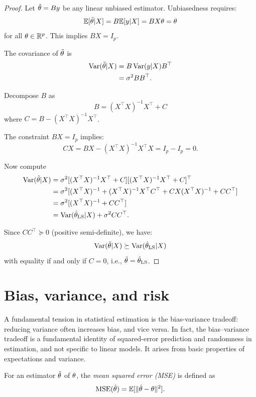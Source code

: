 \begin{proof}
Let $\tilde{\theta} = By$ be any linear unbiased estimator. Unbiasedness requires:
$$\mathbb{E}[\tilde{\theta} | X ] = B\mathbb{E}[y | X ] = BX \theta = \theta$$
for all $\theta \in \mathbb{R}^p$. This implies $BX  = I_p$.

The covariance of $\tilde{\theta}$ is
\begin{align*}
  \operatorname{Var}(\tilde{\theta} | X )
  &= B\operatorname{Var}(y | X )B^\top\\
  &= \sigma^2BB^\top.
\end{align*}

Decompose $B$ as
$$B = (X^\top X )^{-1}X^\top + C$$
where $C = B - (X^\top X)^{-1} X ^\top$.

The constraint $B X  = I_p$ implies:
$$C X  = B X  - ( X^\top X )^{-1} X^\top X = I_p - I_p = 0.$$

Now compute
\begin{align*}
  \operatorname{Var}(\tilde{\theta} | X)
  &= \sigma^2[(X^\top X)^{-1}X^\top + C][(X^\top X)^{-1}X^\top + C]^\top\\
  &= \sigma^2[(X^\top X)^{-1} 
     + (X^\top X)^{-1}X^\top C^\top 
     + CX(X^\top X)^{-1} 
     + CC^\top]\\
  &= \sigma^2[(X^\top X)^{-1} + CC^\top]\\
  &= \operatorname{Var}(\hat{\theta}_{\text{LS}} | X) + \sigma^2 CC^\top.
\end{align*}

Since $CC^\top \succeq 0$ (positive semi-definite), we have:
$$\operatorname{Var}(\tilde{\theta} | X) \succeq \operatorname{Var}(\hat{\theta}_{\text{LS}} | X)$$
with equality if and only if $C = 0$, i.e., $\tilde{\theta} = \hat{\theta}_{\text{LS}}$.

\end{proof}




\section{Bias, variance, and risk}
\label{ss:predictionrisk}


A fundamental tension in statistical estimation is the bias-variance tradeoff: 
reducing variance often increases bias, and vice versa.
In fact, the bias–variance tradeoff is a fundamental identity of squared-error prediction and randomness in estimation, and not specific to linear models. It arises from basic properties of expectations and variance.


\begin{definition}\label{def:mse}
For an estimator $\hat{\theta}$ of $\theta$, the \emph{mean squared error (MSE)} is defined as
$$\operatorname{MSE}(\hat{\theta}) = \mathbb{E}[\|\hat{\theta} - \theta\|^2].$$
\end{definition}

